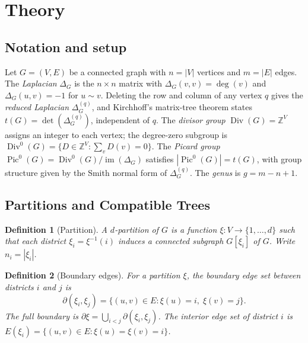\documentclass[11pt]{article}
\newtheorem{definition}{Definition}[section]
\newcommand{\Z}{\mathbb{Z}}
\newcommand{\Pic}{\operatorname{Pic}^0}
\newcommand{\Div}{\operatorname{Div}^0}
\newcommand{\im}{\operatorname{im}}
\begin{document}
\section{Theory}\label{sec:theory}

\subsection*{Notation and setup}

Let $G = (V, E)$ be a connected graph with $n = |V|$ vertices and $m = |E|$
edges. The \emph{Laplacian} $\Delta_G$ is the $n \times n$ matrix with
$\Delta_G(v,v) = \deg(v)$ and $\Delta_G(u,v) = -1$ for $u \sim v$. Deleting
the row and column of any vertex $q$ gives the \emph{reduced Laplacian}
$\Delta_G^{(q)}$, and Kirchhoff's matrix-tree theorem states
$t(G) = \det(\Delta_G^{(q)})$, independent of $q$. The \emph{divisor group}
$\operatorname{Div}(G) = \Z^V$ assigns an integer to each vertex; the
degree-zero subgroup is $\Div(G) = \{D \in \Z^V : \sum_v D(v) = 0\}$. The
\emph{Picard group} $\Pic(G) = \Div(G) / \im(\Delta_G)$ satisfies
$|\Pic(G)| = t(G)$, with group structure given by the Smith normal form of
$\Delta_G^{(q)}$. The \emph{genus} is $g = m - n + 1$.


\subsection{Partitions and Compatible Trees}\label{sec:partitions}

\begin{definition}[Partition]\label{def:partition}
A \emph{$d$-partition} of $G$ is a function $\xi : V \to \{1, \ldots, d\}$
such that each \emph{district} $\xi_i = \xi^{-1}(i)$ induces a connected
subgraph $G[\xi_i]$ of $G$. Write $n_i = |\xi_i|$.
\end{definition}

\begin{definition}[Boundary edges]\label{def:boundary}
For a partition $\xi$, the \emph{boundary edge set} between districts $i$ and $j$ is
\[
  \partial(\xi_i, \xi_j) = \bigl\{(u,v) \in E : \xi(u) = i,\; \xi(v) = j\bigr\}.
\]
The full boundary is $\partial\xi = \bigcup_{i < j} \partial(\xi_i, \xi_j)$.
The \emph{interior edge set} of district $i$ is
$E(\xi_i) = \{(u,v) \in E : \xi(u) = \xi(v) = i\}$.
\end{definition}
\end{document}
